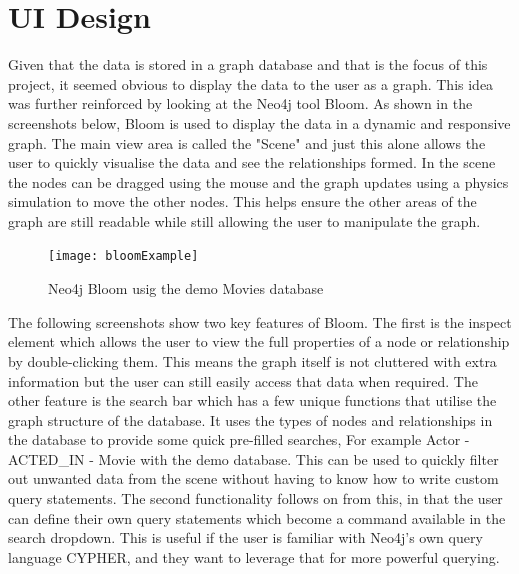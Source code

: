 \section{UI Design}
Given that the data is stored in a graph database and that is the focus of this project, it seemed obvious to display the data 
to the user as a graph. This idea was further reinforced by looking at the Neo4j tool Bloom. As shown in the screenshots below, 
Bloom is used to display the data in a dynamic and responsive graph. The main view area is called the "Scene" and just this alone allows 
the user to quickly visualise the data and see the relationships formed. In the scene the nodes can be dragged using the mouse and the graph updates 
using a physics simulation to move the other nodes. This helps ensure the other areas of the graph are still readable while still allowing the 
user to manipulate the graph.
\begin{figure}[H]
    \centering
    \texttt{[image: bloomExample]}
    \caption{Neo4j Bloom usig the demo Movies database}
\end{figure}
The following screenshots show two key features of Bloom. The first is the inspect element which allows the user to view the full properties 
of a node or relationship by double-clicking them. This means the graph itself is not cluttered with extra information but the user can 
still easily access that data when required. The other feature is the search bar which has a few unique functions that utilise the 
graph structure of the database. It uses the types of nodes and relationships in the database to provide some quick pre-filled searches, 
For example Actor - ACTED\_IN - Movie with the demo database. This can be used to quickly filter out unwanted data from the scene without having to know 
how to write custom query statements. The second functionality follows on from this, in that the user can define their own query statements which 
become a command available in the search dropdown. This is useful if the user is familiar with Neo4j's own query language CYPHER, and they want 
to leverage that for more powerful querying.
